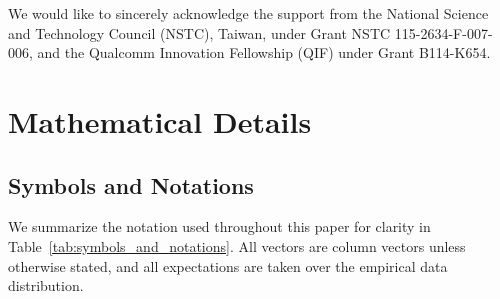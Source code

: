 \documentclass{article}
\theoremstyle{plain}
\theoremstyle{definition}
\theoremstyle{remark}
\begin{document}
We would like to sincerely acknowledge the support from the National Science and Technology Council (NSTC), Taiwan, under Grant NSTC 115-2634-F-007-006, and the Qualcomm Innovation Fellowship (QIF) under Grant B114-K654.











\newpage
\appendix
\onecolumn

\appendix
\section{Mathematical Details}
\label{appendix:mathematical_details}
\subsection{Symbols and Notations}
\label{appendix_subsection:symbols_and_notations}
We summarize the notation used throughout this paper for clarity in Table~\ref{tab:symbols_and_notations}.
All vectors are column vectors unless otherwise stated, and all expectations
are taken over the empirical data distribution.
\end{document}
